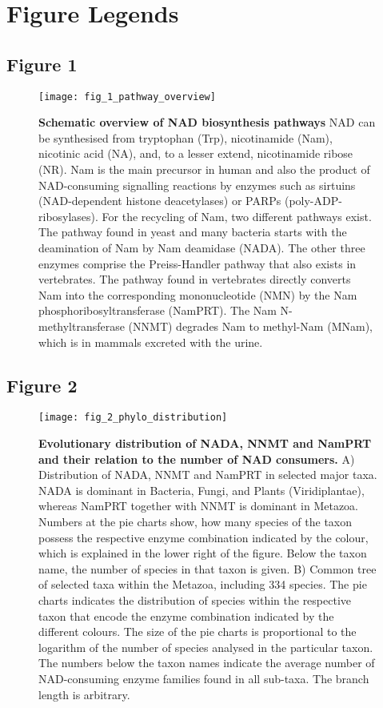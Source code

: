 
\newpage

\section{Figure Legends}

\subsection{Figure 1}

\begin{figure}[ht]
  \centering
  \texttt{[image: fig\_1\_pathway\_overview]}
  \caption{\textbf{Schematic overview of NAD biosynthesis pathways} NAD can be synthesised from tryptophan (Trp), nicotinamide (Nam), nicotinic acid (NA), and, to a lesser extend, nicotinamide ribose (NR). Nam is the main precursor in human and also the product of NAD-consuming signalling reactions by enzymes such as sirtuins (NAD-dependent histone deacetylases) or PARPs (poly-ADP-ribosylases). For the recycling of Nam, two different pathways exist. The pathway found in yeast and many bacteria starts with the deamination of Nam by Nam deamidase (NADA). The other three enzymes comprise the Preiss-Handler pathway that also exists in vertebrates. The pathway found in vertebrates directly converts Nam into the corresponding mononucleotide (NMN) by the Nam phosphoribosyltransferase (NamPRT). The Nam N-methyltransferase (NNMT) degrades Nam to methyl-Nam (MNam), which is in mammals excreted with the urine.}
  \label{fig:pathway_overview}
\end{figure}

\newpage


\subsection{Figure 2}

\begin{figure}[ht]
  \centering
  \texttt{[image: fig\_2\_phylo\_distribution]}
  \caption{\textbf{Evolutionary distribution of NADA, NNMT and NamPRT and their relation to the number of NAD consumers.} A) Distribution of NADA, NNMT and NamPRT in selected major taxa. NADA is dominant in Bacteria, Fungi, and Plants (Viridiplantae), whereas NamPRT together with NNMT is dominant in Metazoa. Numbers at the pie charts show, how many species of the taxon possess the respective enzyme combination indicated by the colour, which is explained in the lower right of the figure. Below the taxon name, the number of species in that taxon is given. B) Common tree of selected taxa within the Metazoa, including 334 species. The pie charts indicates the distribution of species within the respective taxon that encode the enzyme combination indicated by the different colours. The size of the pie charts is proportional to the logarithm of the number of species analysed in the particular taxon. The numbers below the taxon names indicate the average number of NAD-consuming enzyme families found in all sub-taxa. The branch length is arbitrary.}
  \label{fig:phylo_distribution}
\end{figure}

